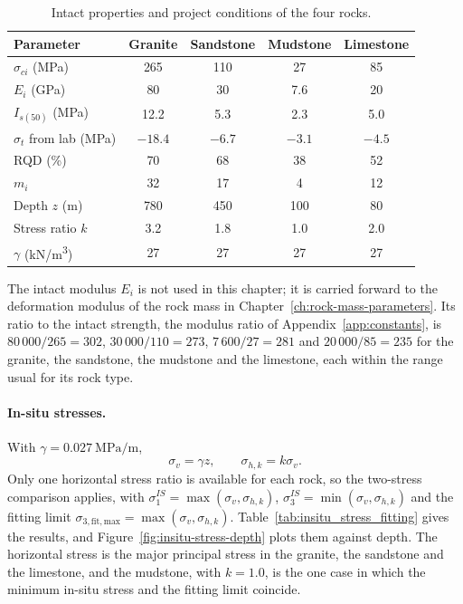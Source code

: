 \begin{table}[htbp]
\caption{Intact properties and project conditions of the four rocks.}
\label{tab:intact_project_data}
\centering
\small
\begin{tabular}{l c c c c}
\toprule
\textbf{Parameter} & \textbf{Granite} & \textbf{Sandstone} & \textbf{Mudstone} & \textbf{Limestone} \\
\midrule
\(\sigma_{ci}\) (MPa) & 265 & 110 & 27 & 85 \\
\(E_i\) (GPa) & 80 & 30 & 7.6 & 20 \\
\(I_{s(50)}\) (MPa) & 12.2 & 5.3 & 2.3 & 5.0 \\
\(\sigma_t\) from lab (MPa) & \(-18.4\) & \(-6.7\) & \(-3.1\) & \(-4.5\) \\
RQD (\%) & 70 & 68 & 38 & 52 \\
\(m_i\) & 32 & 17 & 4 & 12 \\
\midrule
Depth \(z\) (m) & 780 & 450 & 100 & 80 \\
Stress ratio \(k\) & 3.2 & 1.8 & 1.0 & 2.0 \\
\(\gamma\) (kN/m\textsuperscript{3}) & 27 & 27 & 27 & 27 \\
\bottomrule
\end{tabular}
\end{table}

The intact modulus \(E_i\) is not used in this chapter; it is carried forward
to the deformation modulus of the rock mass in
Chapter~\ref{ch:rock-mass-parameters}. Its ratio to the intact strength, the
modulus ratio of Appendix~\ref{app:constants}, is \(80\,000/265 = 302\),
\(30\,000/110 = 273\), \(7\,600/27 = 281\) and \(20\,000/85 = 235\) for the
granite, the sandstone, the mudstone and the limestone, each within the range
usual for its rock type.

\paragraph{In-situ stresses.}
With \(\gamma = 0.027~\text{MPa/m}\),
\[
\sigma_v = \gamma z,
\qquad
\sigma_{h,k} = k\sigma_v .
\]
Only one horizontal stress ratio is available for each rock, so the
two-stress comparison applies, with
\(\sigma_1^{IS}=\max(\sigma_v,\sigma_{h,k})\),
\(\sigma_3^{IS}=\min(\sigma_v,\sigma_{h,k})\) and the fitting limit
\(\sigma_{3,\mathrm{fit,max}}=\max(\sigma_v,\sigma_{h,k})\).
Table~\ref{tab:insitu_stress_fitting} gives the results, and
Figure~\ref{fig:insitu-stress-depth} plots them against depth. The horizontal
stress is the major principal stress in the granite, the sandstone and the
limestone, and the mudstone, with \(k = 1.0\), is the one case in which the
minimum in-situ stress and the fitting limit coincide.

